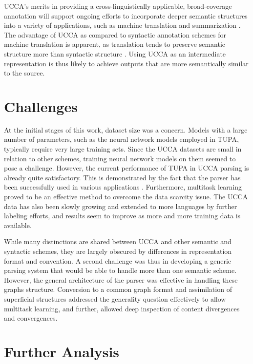 \documentclass[12pt,a4paper,table]{report}
\renewcommand\cite{\citep}      %
\begin{document}
UCCA's merits in providing a cross-linguistically applicable,
broad-coverage annotation will support ongoing efforts to incorporate deeper
semantic structures into a variety of applications, such as machine translation
\citep{jones2012semantics} and summarization \citep{liu2015toward}.
The advantage of UCCA as compared to syntactic annotation schemes for machine translation is apparent,
as translation tends to preserve semantic structure more than syntactic structure \citep{sulem2015conceptual}.
Using UCCA as an intermediate representation is thus likely to achieve outputs that are more
semantically similar to the source.

\section{Challenges}

At the initial stages of this work, dataset size was a concern.
Models with a large number of parameters,
such as the neural network models employed in TUPA,
typically require very large training sets.
Since the UCCA datasets are small in relation to other schemes,
training neural network models on them seemed to pose a challenge.
However,
the current performance of TUPA in UCCA parsing is already quite satisfactory.
This is demonstrated by the fact that the parser has been successfully used in
various applications \cite{choshen2018reference,sulem2018semantic,sulem2018simple}.
Furthermore,
multitask learning proved to be an effective method to overcome the data scarcity issue.
The UCCA data has also been slowly growing and extended to more languages by further labeling efforts,
and results seem to improve as more and more training data is available.

While many distinctions are shared between UCCA and other semantic and syntactic schemes,
they are largely obscured by differences in representation format and convention.
A second challenge was thus in developing a generic parsing system that would be able
to handle more than one semantic scheme.
However, the general architecture of the parser was effective in handling these
graphs structure.
Conversion to a common graph format and assimilation of superficial structures
addressed the generality question effectively to allow multitask learning,
and further, allowed deep inspection of content divergences and convergences.

\section{Further Analysis}
\end{document}
